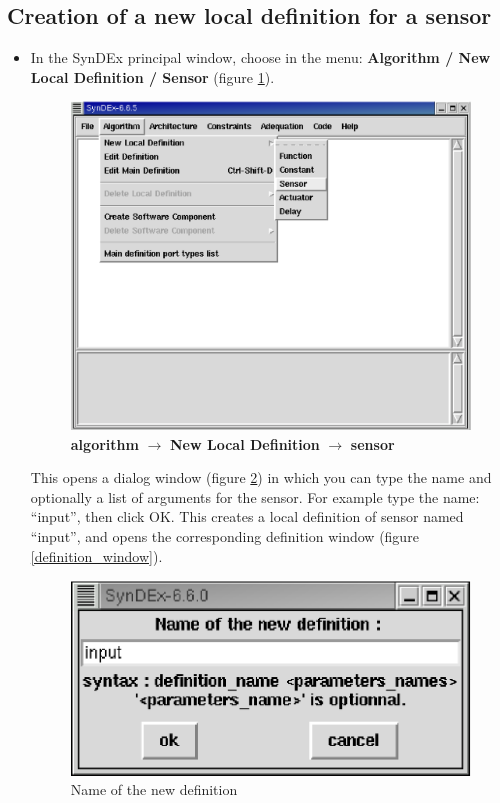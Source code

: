 \documentclass[a4paper,twoside]{report}
\begin{document}
\subsection{Creation of a new local definition for a sensor}
\begin{itemize}
\item In the SynDEx principal window, choose in the menu: \textbf{Algorithm / New Local Definition / Sensor} (figure \ref{A_NLD_S}).

\begin{figure}[htbp]
  \begin{center}
        \includegraphics[scale=0.53]{Algorithm_NewLocalDefinition_Sensor.eps}
  \end{center}
  \caption{\textbf{algorithm} $\rightarrow$ \textbf{New Local Definition} $\rightarrow$ \textbf{sensor}}
  \label{A_NLD_S}
\end{figure}

This opens a dialog window (figure \ref{new_definition}) in which you can type
the name and optionally a list of arguments for the sensor. For example type
the name: ``input'', then click OK. This creates a local definition of sensor
named ``input'', and opens the corresponding definition window (figure
\ref{definition_window}).

\begin{figure}[htbp]
  \begin{center}
        \includegraphics[width=0.45\linewidth]{Name_of_the_new_definition.eps}
  \end{center}
  \caption{Name of the new definition}
  \label{new_definition}
\end{figure}


\end{itemize}
\end{document}
